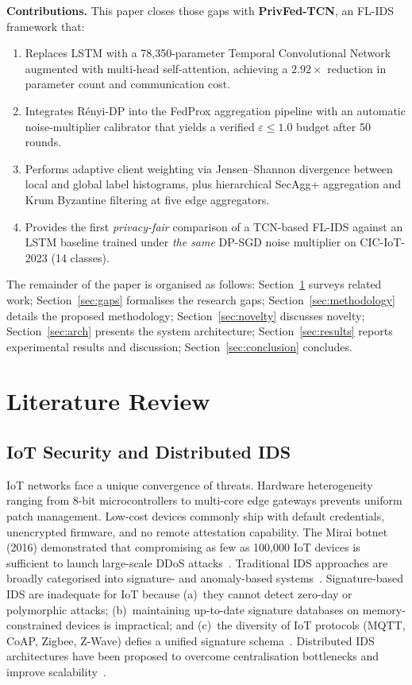 \documentclass[conference]{IEEEtran}
\newcommand{\eps}{\varepsilon}
\begin{document}
\textbf{Contributions.} This paper closes those gaps with
\textbf{PrivFed-TCN}, an FL-IDS framework that:
\begin{enumerate}
\item Replaces LSTM with a 78,350-parameter Temporal Convolutional
      Network augmented with multi-head self-attention, achieving a
      \textbf{$2.92\times$} reduction in parameter count and
      communication cost.
\item Integrates \mbox{R\'enyi-DP} into the FedProx aggregation
      pipeline with an automatic noise-multiplier calibrator that
      yields a verified $\eps\le 1.0$ budget after 50 rounds.
\item Performs adaptive client weighting via Jensen--Shannon
      divergence between local and global label histograms, plus
      hierarchical SecAgg+ aggregation and Krum Byzantine filtering at
      five edge aggregators.
\item Provides the first \emph{privacy-fair} comparison of a TCN-based
      FL-IDS against an LSTM baseline trained under \emph{the same}
      DP-SGD noise multiplier on CIC-IoT-2023 (14 classes).
\end{enumerate}
The remainder of the paper is organised as follows: Section~\ref{sec:lr}
surveys related work; Section~\ref{sec:gaps} formalises the research
gaps; Section~\ref{sec:methodology} details the proposed methodology;
Section~\ref{sec:novelty} discusses novelty; Section~\ref{sec:arch}
presents the system architecture; Section~\ref{sec:results} reports
experimental results and discussion; Section~\ref{sec:conclusion}
concludes.

\section{Literature Review}\label{sec:lr}

\subsection{IoT Security and Distributed IDS}
IoT networks face a unique convergence of threats. Hardware
heterogeneity ranging from 8-bit microcontrollers to multi-core edge
gateways prevents uniform patch management. Low-cost devices commonly
ship with default credentials, unencrypted firmware, and no remote
attestation capability. The Mirai botnet (2016) demonstrated that
compromising as few as 100,000 IoT devices is sufficient to launch
large-scale DDoS attacks~\cite{kolias2017}. Traditional IDS approaches
are broadly categorised into signature- and anomaly-based
systems~\cite{lunt1993,denning1987}. Signature-based IDS are inadequate
for IoT because (a)~they cannot detect zero-day or polymorphic
attacks; (b)~maintaining up-to-date signature databases on
memory-constrained devices is impractical; and (c)~the diversity of
IoT protocols (MQTT, CoAP, Zigbee, Z-Wave) defies a unified signature
schema~\cite{sicari2015}. Distributed IDS architectures have been
proposed to overcome centralisation bottlenecks and improve
scalability~\cite{zhang2014}.
\end{document}
